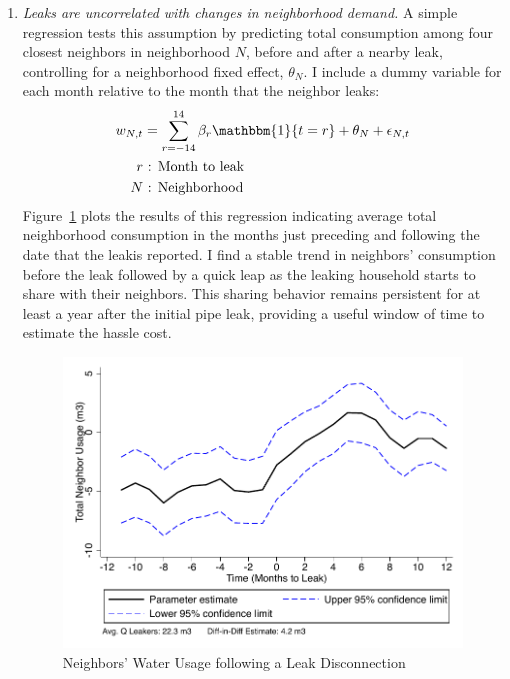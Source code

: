 \documentclass[12pt]{article}
\begin{document}
\begin{appendices}
\begin{enumerate}
	\item \textit{ Leaks are uncorrelated with changes in neighborhood demand. }  A simple regression tests this assumption by predicting total consumption among four closest neighbors in neighborhood $N$, before and after a nearby leak, controlling for a neighborhood fixed effect, $\theta_{N}$.  I include a dummy variable for each month relative to the month that the neighbor leaks:
	\begin{align*}
	w_{N,t} &= \sum_{r=-14}^{14} \beta_{r} \mathbbm{1} \{t=r\}  +  \theta_{N} + \epsilon_{N,t} \\
	r &\text{ : Month to leak} \\
	N &\text{ : Neighborhood }
	\end{align*}
	Figure~\ref{figure:leakeventstudy} plots the results of this regression indicating average total neighborhood consumption in the months just preceding and following the date that the leakis reported.  I find a stable trend in neighbors' consumption before the leak followed by a quick leap as the leaking household starts to share with their neighbors.  This sharing behavior remains persistent for at least a year after the initial pipe leak, providing a useful window of time to estimate the hassle cost.
	\begin{figure}
	\centering
	\caption{Neighbors' Water Usage following a Leak Disconnection}\label{figure:leakeventstudy}
	\begin{center}
	\includegraphics[scale=.7]{tables/leakers_full_2.pdf}
	\end{center}
	\end{figure}


\end{enumerate}
\end{appendices}
\end{document}
